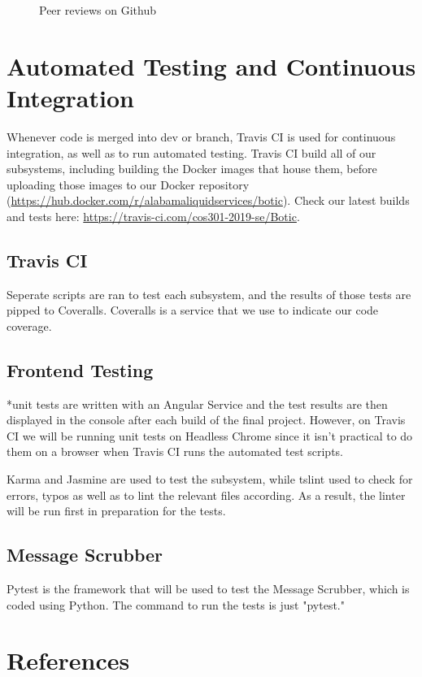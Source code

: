 \documentclass[11pt]{article}
\begin{document}
\begin{figure}[H]
	\centering
	\caption{Peer reviews on Github}
\end{figure}

\section{Automated Testing and Continuous Integration}

Whenever code is merged into dev or branch, Travis CI is used for continuous integration, as well as to run automated testing. Travis CI build all of our subsystems, including building the Docker images that house them, before uploading those images to our Docker repository (\url{https://hub.docker.com/r/alabamaliquidservices/botic}). Check our latest builds and tests here: \url{https://travis-ci.com/cos301-2019-se/Botic}.

\subsection{Travis CI}

Seperate scripts are ran to test each subsystem, and the results of those tests are pipped to Coveralls. Coveralls is a service that we use to indicate our code coverage.

\subsection{Frontend Testing}

*unit tests are written with an Angular Service and the test results are then displayed in the console after each build of the final project. However, on Travis CI we will be running unit tests on Headless Chrome\cite{Website:3} since it isn't practical to do them on a browser when Travis CI runs the automated test scripts.\par
Karma and Jasmine are used to test the subsystem, while tslint used to check for errors, typos as well as to lint the relevant files according. As a result, the linter will be run first in preparation for the tests.

\subsection{Message Scrubber}

Pytest is the framework that will be used to test the Message Scrubber, which is coded using Python. The command to run the tests is just "pytest."

\section{References}


\end{document}
